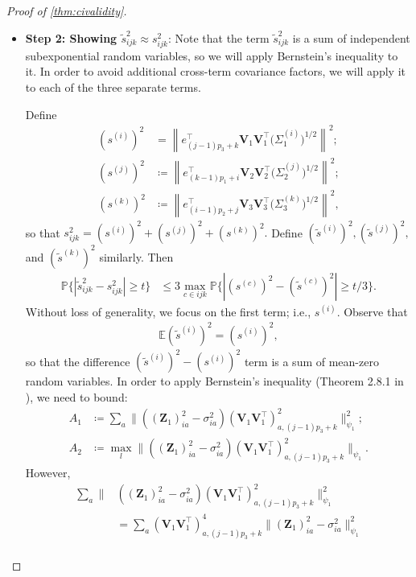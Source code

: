\documentclass[10pt]{article}
\newcommand{\0}{{\mathbf{0}}}
\newcommand{\1}{{\mathbf{1}}}
\newcommand{\E}{{\mathbf{E}}}
\renewcommand{\citet}{\cite}
\renewcommand{\t}{^{\top}}
\newcommand{\p}{\mathbb{P}}
\renewcommand{\E}{\mathbb{E}}
\renewcommand{\tilde}{\widetilde}
\begin{document}
\begin{proof}[Proof of \cref{thm:civalidity}]
\begin{itemize}
\item 
\textbf{Step 2: Showing $\tilde s^2_{ijk} \approx s^2_{ijk}$}: 
Note that the term $\tilde s^2_{ijk}$ is a sum of independent subexponential random variables, so we will apply Bernstein's inequality to it.  In order to avoid additional cross-term covariance factors, we will apply it to each of the three separate terms. 

Define
\begin{align*}
    (s^{(i)})^2 &= \left\|e_{(j-1) p_{3}+k}^{\top} \mathbf{V}_{1} \mathbf{V}_{1}^{\top} \big(\Sigma^{(i)}_1\big)^{1/2}\right\|^{2}; \\
    (s^{(j)})^2  &\coloneqq \left\|e_{(k-1) p_{1}+i}\t \mathbf{V}_{2} \mathbf{V}_{2}^{\top} \big(\Sigma^{(j)}_2\big)^{1/2}\right\|^{2}; \\
    (s^{(k)})^2 &\coloneqq \left\|e_{(i-1)p_{2}+j}\t \mathbf{V}_{3} \mathbf{V}_{3}^{\top} \big(\Sigma^{(k)}_3\big)^{1/2}\right\|^{2},
\end{align*}
so that $s^2_{ijk} = (s^{(i)})^2 + (s^{(j)})^2 + (s^{(k)})^2.$ Define $(\tilde s^{(i)})^2, (\tilde s^{(j)})^2,$ and $(\tilde s^{(k)})^2$ similarly.  Then
\begin{align*}
    \p\bigg\{ |\tilde s^2_{ijk} - s^2_{ijk} | \geq t \bigg\} &\leq 3 \max_{c \in ijk} \p\bigg\{ | (s^{(c)})^2 - (\tilde s^{(c)})^2| \geq t/3 \bigg\}.
\end{align*}
Without loss of generality, we focus on the first term; i.e., $s^{(i)}$.  Observe that
\begin{align*}
    \E (\tilde s^{(i)})^2 = (s^{(i)})^2,
\end{align*}
so that the difference $(\tilde s^{(i)})^2 - (s^{(i)})^2$ term is a sum of mean-zero random variables.  In order to apply Bernstein's inequality (Theorem 2.8.1 in \citet{vershynin_high-dimensional_2018}), we need to bound:
\begin{align*}
A_1 &\coloneqq \sum_{a} \| (( \mathbf{Z}_1)_{ia}^2 - \sigma^2_{ia} ) (\mathbf{V}_1 \mathbf{V}_1\t)_{a,(j-1)p_3 + k}^2 \|_{\psi_1}^2; \\
A_2 &\coloneqq \max_{l}\| (( \mathbf{Z}_1)_{ia}^2 - \sigma^2_{ia} ) (\mathbf{V}_1 \mathbf{V}_1\t)_{a,(j-1)p_3 + k} ^2\|_{\psi_1}.
\end{align*}
However,
\begin{align*}
    \sum_{a} \|& (( \mathbf{Z}_1)_{ia}^2 - \sigma^2_{ia} ) (\mathbf{V}_1 \mathbf{V}_1\t)_{a,(j-1)p_3 + k}^2 \|_{\psi_1}^2   \\
     &= \sum_{a}(\mathbf{V}_1 \mathbf{V}_1\t)_{a,(j-1)p_3 + k}^4 \| (\mathbf{Z}_1)_{ia}^2 - \sigma^2_{ia} \|_{\psi_1}^2 \\

\end{align*}
\end{itemize}
\end{proof}
\end{document}
